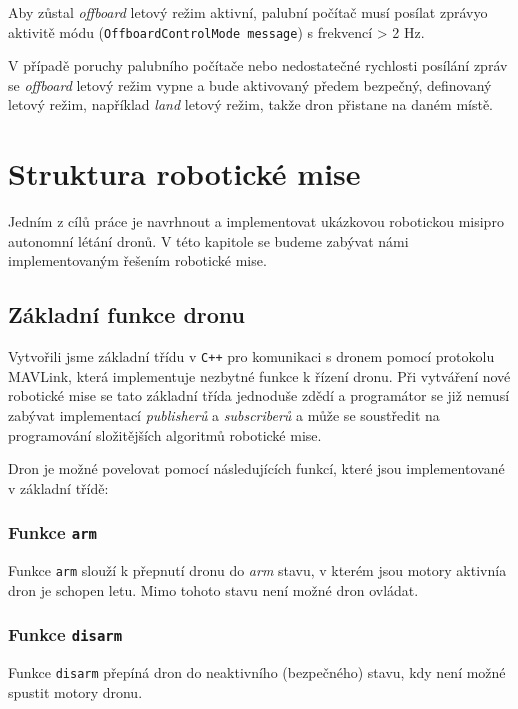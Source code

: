 Aby zůstal \textit{offboard} letový režim aktivní, palubní počítač musí posílat zprávy\break o aktivitě módu (\texttt{OffboardControlMode message}) s frekvencí > 2 Hz.

V případě poruchy palubního počítače nebo nedostatečné rychlosti posílání zpráv se \textit{offboard} letový režim vypne a bude aktivovaný předem bezpečný, definovaný letový režim, například \textit{land} letový režim, takže dron přistane na daném místě. \cite{PX4docs}

\section{Struktura robotické mise}

Jedním z cílů práce je navrhnout a implementovat ukázkovou robotickou misi\break pro autonomní létání dronů. V této kapitole se budeme zabývat námi implementovaným řešením robotické mise.

\subsection{Základní funkce dronu}

Vytvořili jsme základní třídu  v \texttt{C++} pro komunikaci s dronem pomocí protokolu MAVLink, která implementuje nezbytné funkce k řízení dronu. Při vytváření nové robotické mise se tato základní třída jednoduše zdědí a programátor se již nemusí zabývat implementací \textit{publisherů} a \textit{subscriberů} a může se soustředit na programování složitějších algoritmů robotické mise.

Dron je možné povelovat pomocí následujících funkcí, které jsou implementované v základní třídě:

\subsubsection{Funkce \texttt{arm}}

Funkce \texttt{arm} slouží k přepnutí dronu do \textit{arm} stavu, v kterém jsou motory aktivní\break a dron je schopen letu. Mimo tohoto stavu není možné dron ovládat. 

\subsubsection{Funkce \texttt{disarm}}

Funkce \texttt{disarm} přepíná dron do neaktivního (bezpečného) stavu, kdy není možné spustit motory dronu.

